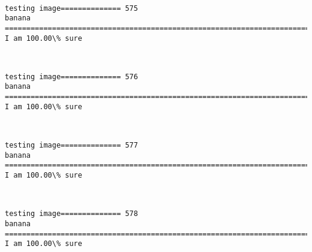 \documentclass[11pt]{article}
\begin{document}
    \begin{center}
    \end{center}
    { \hspace*{\fill} \\}
    
    \begin{Verbatim}[commandchars=\\\{\}]
testing image============== 575
banana
============================================================================
I am 100.00\% sure

    \end{Verbatim}

    \begin{center}
    \end{center}
    { \hspace*{\fill} \\}
    
    \begin{Verbatim}[commandchars=\\\{\}]
testing image============== 576
banana
============================================================================
I am 100.00\% sure

    \end{Verbatim}

    \begin{center}
    \end{center}
    { \hspace*{\fill} \\}
    
    \begin{Verbatim}[commandchars=\\\{\}]
testing image============== 577
banana
============================================================================
I am 100.00\% sure

    \end{Verbatim}

    \begin{center}
    \end{center}
    { \hspace*{\fill} \\}
    
    \begin{Verbatim}[commandchars=\\\{\}]
testing image============== 578
banana
============================================================================
I am 100.00\% sure

    \end{Verbatim}
\end{document}
